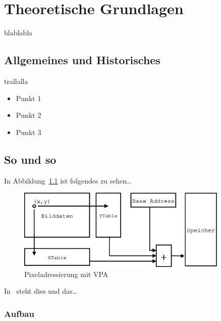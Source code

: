 
\chapter{Theoretische Grundlagen}

blablabla

\section{Allgemeines und Historisches}

trallalla

\begin{itemize}
 \item Punkt 1
  \item Punkt 2
  \item Punkt 3
\end{itemize}


\section{So und so}

In Abbildung~\ref{pic_vpa1} ist folgendes zu sehen\ldots

\begin{figure}[!h]
\begin{center}
\includegraphics[width=0.9\textwidth]{images/vpa1.eps}
\caption{Pixeladressierung mit VPA} \label{pic_vpa1}
\end{center}
\end{figure}

In~\cite{zamperoni} steht dies und das\ldots

\subsection{Aufbau}
